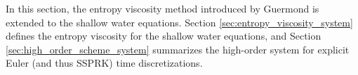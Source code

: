 In this section, the entropy viscosity method introduced by Guermond
\cite{guermond_ev}\cite{guermond_secondorder} is extended to the shallow
water equations.
Section \ref{sec:entropy_viscosity_system} defines the entropy viscosity
for the shallow water equations, and Section \ref{sec:high_order_scheme_system}
summarizes the high-order system for explicit Euler (and thus SSPRK)
time discretizations.
